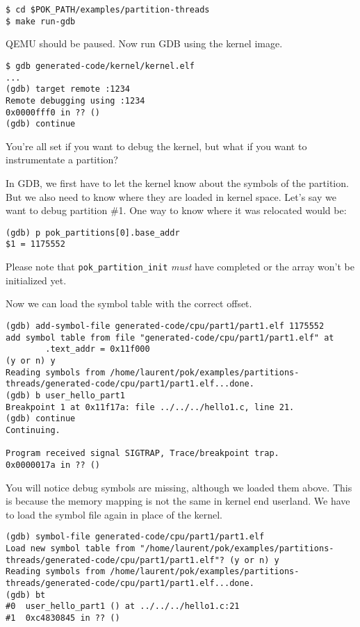 \documentclass[oneside]{article}
\begin{document}
\begin{verbatim}
$ cd $POK_PATH/examples/partition-threads
$ make run-gdb
\end{verbatim}

QEMU should be paused. Now run GDB using the kernel image.

\begin{verbatim}
$ gdb generated-code/kernel/kernel.elf
...
(gdb) target remote :1234
Remote debugging using :1234
0x0000fff0 in ?? ()
(gdb) continue
\end{verbatim}

You're all set if you want to debug the kernel, but what if you want to
instrumentate a partition?

In GDB, we first have to let the kernel know about the symbols of the
partition. But we also need to know where they are loaded in kernel space.
Let's say we want to debug partition \#1. One way to know where it was
relocated would be:

\begin{verbatim}
(gdb) p pok_partitions[0].base_addr
$1 = 1175552
\end{verbatim}

Please note that \texttt{pok\_partition\_init} \textit{must} have completed
or the array won't be initialized yet.

Now we can load the symbol table with the correct offset.

{
\normalsize

\begin{verbatim}
(gdb) add-symbol-file generated-code/cpu/part1/part1.elf 1175552
add symbol table from file "generated-code/cpu/part1/part1.elf" at
        .text_addr = 0x11f000
(y or n) y
Reading symbols from /home/laurent/pok/examples/partitions-threads/generated-code/cpu/part1/part1.elf...done.
(gdb) b user_hello_part1
Breakpoint 1 at 0x11f17a: file ../../../hello1.c, line 21.
(gdb) continue
Continuing.

Program received signal SIGTRAP, Trace/breakpoint trap.
0x0000017a in ?? ()
\end{verbatim}
}

You will notice debug symbols are missing, although we loaded them above.
This is because the memory mapping is not the same in kernel end userland.
We have to load the symbol file again in place of the kernel.

{
\normalsize

\begin{verbatim}
(gdb) symbol-file generated-code/cpu/part1/part1.elf
Load new symbol table from "/home/laurent/pok/examples/partitions-threads/generated-code/cpu/part1/part1.elf"? (y or n) y
Reading symbols from /home/laurent/pok/examples/partitions-threads/generated-code/cpu/part1/part1.elf...done.
(gdb) bt
#0  user_hello_part1 () at ../../../hello1.c:21
#1  0xc4830845 in ?? ()
\end{verbatim}
}
\end{document}
